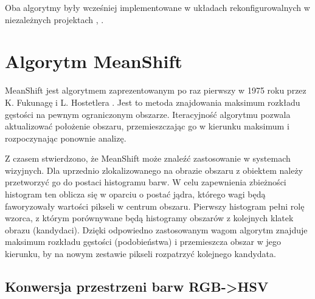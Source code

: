 Oba algorytmy były wcześniej implementowane w układach rekonfigurowalnych w niezależnych projektach \cite{Mazur}, \cite{Drozdz}.

\section{Algorytm MeanShift}

MeanShift jest algorytmem zaprezentowanym po raz pierwszy w 1975 roku przez K. Fukunagę i L. Hostetlera \cite{Fukunaga}. Jest to metoda znajdowania maksimum rozkładu gęstości na pewnym ograniczonym obszarze. Iteracyjność algorytmu pozwala aktualizować położenie obszaru, przemieszczając go w kierunku maksimum i rozpoczynając ponownie analizę.

Z czasem stwierdzono, że MeanShift może znaleźć zastosowanie w systemach wizyjnych. Dla uprzednio zlokalizowanego na obrazie obszaru z obiektem należy przetworzyć go do postaci histogramu barw. W celu zapewnienia zbieżności histogram ten oblicza się w oparciu o postać jądra, którego wagi będą faworyzowały wartości pikseli w centrum obszaru. Pierwszy histogram pełni rolę wzorca, z którym porównywane będą histogramy obszarów z kolejnych klatek obrazu (kandydaci). Dzięki odpowiedno zastosowanym wagom algorytm znajduje maksimum rozkładu gęstości (podobieństwa) i przemieszcza obszar w jego kierunku, by na nowym zestawie pikseli rozpatrzyć kolejnego kandydata.

\subsection{Konwersja przestrzeni barw RGB->HSV}
\label{sec:rgb2hsv} %


